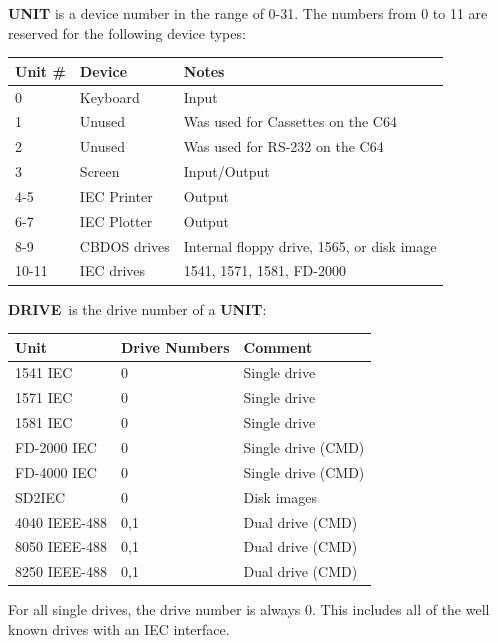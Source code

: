 {\bf UNIT} is a device number in the range of 0-31.
The numbers from 0 to 11 are reserved for the following device types:

\setlength{\tabcolsep}{1mm}
\begin{center}
\begin{tabular}{|l|l|l|}
\hline
{\bf Unit} \# & {\bf Device}  & {\bf Notes} \\
\hline
0        & Keyboard & Input \\
1        & Unused   & Was used for Cassettes on the C64 \\
2        & Unused   & Was used for RS-232 on the C64 \\
3        & Screen   & Input/Output     \\
4-5      & IEC Printer  & Output     \\
6-7      & IEC Plotter  & Output     \\
8-9      & CBDOS drives\footnotemark{} & Internal floppy drive, 1565\footnotemark{}, or disk image \\
10-11    & IEC drives   & 1541, 1571, 1581, FD-2000 \\
\hline
\end{tabular}
\end{center}
\addtocounter{footnote}{-2}

{\bf DRIVE} is the drive number of a {\bf UNIT}:

\setlength{\tabcolsep}{1mm}
\begin{center}
\begin{tabular}{|l|l|l|}
\hline
{\bf Unit}  & {\bf Drive Numbers} & {\bf Comment} \\
\hline
1541 IEC & 0             & Single drive \\
1571 IEC & 0             & Single drive \\
1581 IEC & 0             & Single drive \\
FD-2000 IEC & 0             & Single drive (CMD)\\
FD-4000 IEC & 0             & Single drive (CMD)\\
SD2IEC      & 0             & Disk images\\
4040 IEEE-488 & 0,1             & Dual drive (CMD)\\
8050 IEEE-488 & 0,1             & Dual drive (CMD)\\
8250 IEEE-488 & 0,1             & Dual drive (CMD)\\
\hline
\end{tabular}
\end{center}
For all single drives, the drive number is always 0.
This includes all of the well known drives with an IEC interface.


